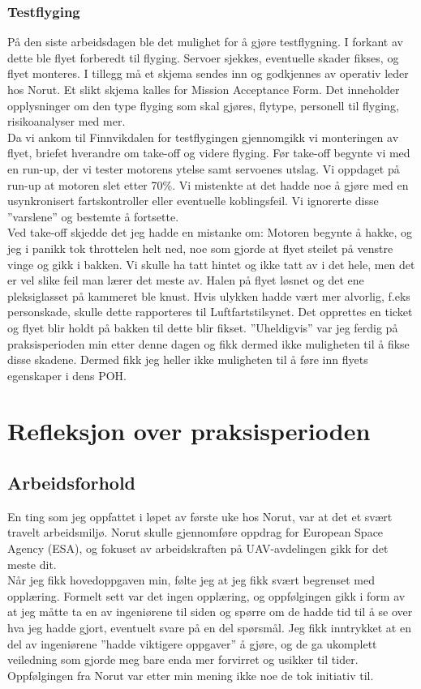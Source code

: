 \documentclass[12pt, a4paper]{article}
\begin{document}
\subsubsection{Testflyging}
På den siste arbeidsdagen ble det mulighet for å gjøre testflygning. I forkant av dette ble flyet forberedt til flyging. Servoer sjekkes, eventuelle skader fikses, og flyet monteres. I tillegg må et skjema sendes inn og godkjennes av operativ leder hos Norut. Et slikt skjema kalles for Mission Acceptance Form. Det inneholder opplysninger om den type flyging som skal gjøres, flytype, personell til flyging, risikoanalyser med mer. \\
Da vi ankom til Finnvikdalen for testflygingen gjennomgikk vi monteringen av flyet, briefet hverandre om take-off og videre flyging. Før take-off begynte vi med en run-up, der vi tester motorens ytelse samt servoenes utslag. Vi oppdaget på run-up at motoren slet etter 
70\%. Vi mistenkte at det hadde noe å gjøre med en usynkronisert fartskontroller eller eventuelle koblingsfeil. Vi ignorerte disse ''varslene'' og bestemte å fortsette. \\
Ved take-off skjedde det jeg hadde en mistanke om: Motoren begynte å hakke, og jeg i panikk tok throttelen helt ned, noe som gjorde at flyet steilet på venstre vinge og gikk i bakken. Vi skulle ha tatt hintet og ikke tatt av i det hele, men det er vel slike feil man lærer det meste av. Halen på flyet løsnet og det ene pleksiglasset på kammeret ble knust. 
Hvis ulykken hadde vært mer alvorlig, f.eks personskade, skulle dette rapporteres til Luftfartstilsynet. Det opprettes en ticket og flyet blir holdt på bakken til dette blir fikset. ''Uheldigvis'' var jeg ferdig på praksisperioden min etter denne dagen og fikk dermed ikke muligheten til å fikse disse skadene. Dermed fikk jeg heller ikke muligheten til å føre inn flyets egenskaper i dens POH. 

\section{Refleksjon over praksisperioden}
\subsection{Arbeidsforhold}
En ting som jeg oppfattet i løpet av første uke hos Norut, var at det et svært travelt arbeidsmiljø. Norut skulle gjennomføre oppdrag for European Space Agency (ESA), og fokuset av arbeidskraften på UAV-avdelingen gikk for det meste dit.\\
Når jeg fikk hovedoppgaven min, følte jeg at jeg fikk svært begrenset med opplæring. Formelt sett var det ingen opplæring, og oppfølgingen gikk i form av at jeg måtte ta en av ingeniørene til siden og spørre om de hadde tid til å se over hva jeg hadde gjort, eventuelt svare på en del spørsmål. Jeg fikk inntrykket at en del av ingeniørene ''hadde viktigere oppgaver'' å gjøre, og de ga ukomplett veiledning som gjorde meg bare enda mer forvirret og usikker til tider. Oppfølgingen fra Norut var etter min mening ikke noe de tok initiativ til.\\
\end{document}
